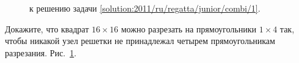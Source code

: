 \ifsolution
\begin{figure}\centering
    \caption{к решению задачи \ref{solution:2011/ru/regatta/junior/combi/1}.}
    \label{fig:solution:2011/ru/regatta/junior/combi/1}
\end{figure}%
\fi %

\problem
Докажите, что квадрат $16 \times 16$ можно разрезать на прямоугольники
$1 \times 4$ так, чтобы никакой узел решетки не принадлежал четырем
прямоугольникам разрезания.
\solution
\label{solution:2011/ru/regatta/junior/combi/1}%
Рис.~\ref{fig:solution:2011/ru/regatta/junior/combi/1}.
\endproblem
